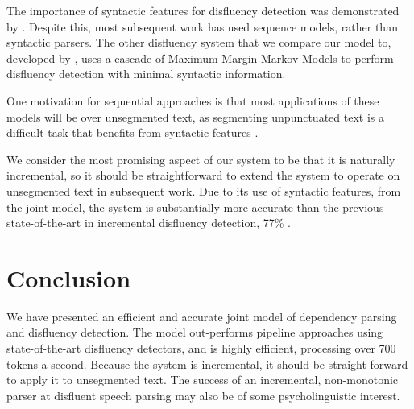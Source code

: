 \documentclass[11pt,letterpaper]{article}
\begin{document}
The importance of syntactic features for disfluency detection was demonstrated
by \citep{Johnson04a}.
Despite this, most subsequent work has used sequence models, rather than syntactic
parsers.  The other disfluency system that we compare our model to, developed
by \citet{qian:13}, uses a cascade of Maximum Margin Markov Models to perform
disfluency detection with minimal syntactic information.

One motivation for sequential approaches is that most applications of these models will be
over unsegmented text, as segmenting unpunctuated text
is a difficult task that benefits from syntactic features \citep{zhang:13}.

We consider the most promising aspect of our system to be that it is naturally
incremental, so it should be straightforward to extend the system to operate
on unsegmented text in subsequent work.  Due to its use of syntactic features,
from the joint model, the system is substantially more accurate than the previous
state-of-the-art in incremental disfluency detection, 77\% \citep{zwarts:10}.



\section{Conclusion}

We have presented an efficient and accurate joint model of dependency parsing and
disfluency detection.  The model out-performs pipeline approaches using state-of-the-art
disfluency detectors, and is highly efficient, processing over 700 tokens a second.
Because the system is incremental, it should be straight-forward to apply it
to unsegmented text. The success of an incremental, non-monotonic parser at
disfluent speech parsing may also be of some psycholinguistic interest.



\end{document}
